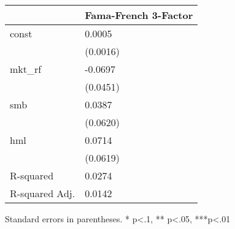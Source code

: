 \begin{table}
\caption{}
\label{}
\begin{center}
\begin{tabular}{ll}
\hline
               & Fama-French 3-Factor  \\
\hline
const          & 0.0005                \\
               & (0.0016)              \\
mkt\_rf        & -0.0697               \\
               & (0.0451)              \\
smb            & 0.0387                \\
               & (0.0620)              \\
hml            & 0.0714                \\
               & (0.0619)              \\
R-squared      & 0.0274                \\
R-squared Adj. & 0.0142                \\
\hline
\end{tabular}
\end{center}
\end{table}
\bigskip
Standard errors in parentheses. \newline 
* p<.1, ** p<.05, ***p<.01